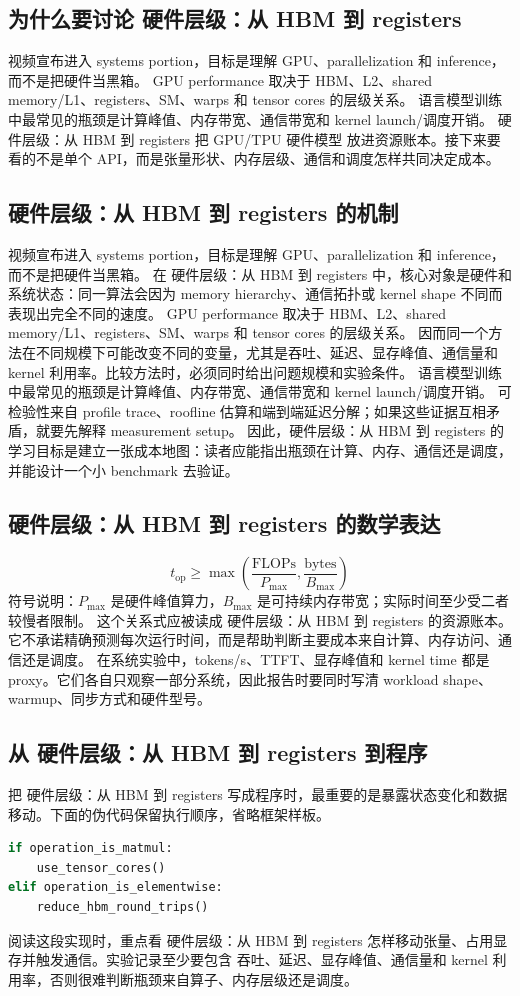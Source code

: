 \documentclass[a4paper]{article}
\begin{document}
\subsection{为什么要讨论 硬件层级：从 HBM 到 registers}
视频宣布进入 systems portion，目标是理解 GPU、parallelization 和 inference，而不是把硬件当黑箱。
GPU performance 取决于 HBM、L2、shared memory/L1、registers、SM、warps 和 tensor cores 的层级关系。
语言模型训练中最常见的瓶颈是计算峰值、内存带宽、通信带宽和 kernel launch/调度开销。
硬件层级：从 HBM 到 registers 把 GPU/TPU 硬件模型 放进资源账本。接下来要看的不是单个 API，而是张量形状、内存层级、通信和调度怎样共同决定成本。
\subsection{硬件层级：从 HBM 到 registers 的机制}
视频宣布进入 systems portion，目标是理解 GPU、parallelization 和 inference，而不是把硬件当黑箱。 在 硬件层级：从 HBM 到 registers 中，核心对象是硬件和系统状态：同一算法会因为 memory hierarchy、通信拓扑或 kernel shape 不同而表现出完全不同的速度。
GPU performance 取决于 HBM、L2、shared memory/L1、registers、SM、warps 和 tensor cores 的层级关系。 因而同一个方法在不同规模下可能改变不同的变量，尤其是吞吐、延迟、显存峰值、通信量和 kernel 利用率。比较方法时，必须同时给出问题规模和实验条件。
语言模型训练中最常见的瓶颈是计算峰值、内存带宽、通信带宽和 kernel launch/调度开销。 可检验性来自 profile trace、roofline 估算和端到端延迟分解；如果这些证据互相矛盾，就要先解释 measurement setup。
因此，硬件层级：从 HBM 到 registers 的学习目标是建立一张成本地图：读者应能指出瓶颈在计算、内存、通信还是调度，并能设计一个小 benchmark 去验证。
\subsection{硬件层级：从 HBM 到 registers 的数学表达}
\[t_{\text{op}}\ge \max\left(\frac{\text{FLOPs}}{P_{\max}},\frac{\text{bytes}}{B_{\max}}\right)\]
符号说明：\(P_{\max}\) 是硬件峰值算力，\(B_{\max}\) 是可持续内存带宽；实际时间至少受二者较慢者限制。
这个关系式应被读成 硬件层级：从 HBM 到 registers 的资源账本。它不承诺精确预测每次运行时间，而是帮助判断主要成本来自计算、内存访问、通信还是调度。
在系统实验中，tokens/s、TTFT、显存峰值和 kernel time 都是 proxy。它们各自只观察一部分系统，因此报告时要同时写清 workload shape、warmup、同步方式和硬件型号。
\subsection{从 硬件层级：从 HBM 到 registers 到程序}
把 硬件层级：从 HBM 到 registers 写成程序时，最重要的是暴露状态变化和数据移动。下面的伪代码保留执行顺序，省略框架样板。
\begin{lstlisting}[language=Python]
if operation_is_matmul:
    use_tensor_cores()
elif operation_is_elementwise:
    reduce_hbm_round_trips()
\end{lstlisting}
阅读这段实现时，重点看 硬件层级：从 HBM 到 registers 怎样移动张量、占用显存并触发通信。实验记录至少要包含 吞吐、延迟、显存峰值、通信量和 kernel 利用率，否则很难判断瓶颈来自算子、内存层级还是调度。
\end{document}
